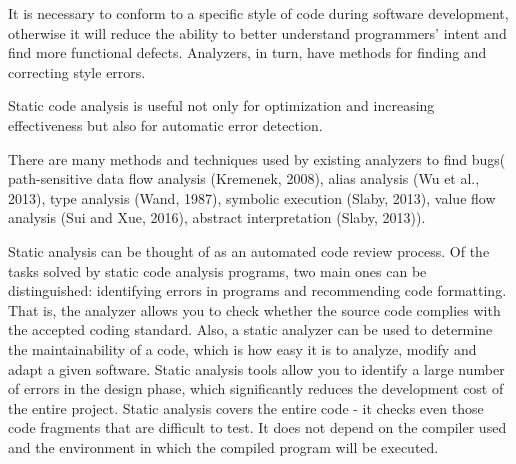 It is necessary to conform to a specific style of code during software development, otherwise it will reduce the ability to better understand programmers’ intent and ﬁnd more functional defects. Analyzers, in turn, have methods for finding and correcting style errors. 

Static code analysis is useful not only for optimization and increasing effectiveness but also for automatic error detection.

There are many methods and techniques used by existing analyzers to ﬁnd bugs( path-sensitive data ﬂow analysis (Kremenek, 2008), alias analysis (Wu et al., 2013), type analysis (Wand, 1987), symbolic execution (Slaby, 2013), value ﬂow analysis (Sui and Xue, 2016), abstract interpretation (Slaby, 2013)).

Static analysis can be thought of as an automated code review process. Of the tasks solved by static code analysis programs, two main ones can be distinguished: identifying errors in programs and recommending code formatting. That is, the analyzer allows you to check whether the source code complies with the accepted coding standard. Also, a static analyzer can be used to determine the maintainability of a code, which is how easy it is to analyze, modify and adapt a given software. Static analysis tools allow you to identify a large number of errors in the design phase, which significantly reduces the development cost of the entire project. Static analysis covers the entire code - it checks even those code fragments that are difficult to test. It does not depend on the compiler used and the environment in which the compiled program will be executed.